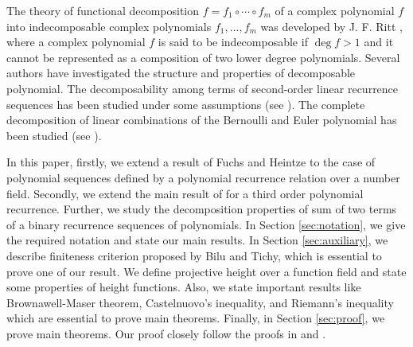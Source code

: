 \documentclass[12pt]{amsart}
\begin{document}
	
The theory of functional decomposition $f = f_1 \circ \cdots \circ f_m$ of a complex polynomial $f$ into indecomposable complex polynomials $f_1,\ldots, f_m$ was developed by J. F. Ritt \cite{ritt}, where a complex polynomial $f$ is said to be
indecomposable if $\deg f > 1$ and it cannot be represented as a composition of two lower
degree polynomials. Several authors have investigated the structure and properties of decomposable polynomial. The decomposability among terms of second-order linear recurrence sequences has been studied under some assumptions (see \cite{fuchs2019decomposable,kreso2022decompositions}). The complete decomposition of linear combinations
of the Bernoulli and Euler polynomial has been studied (see \cite{pinter, pinter2022, pinter2024}).
	
In this paper, firstly, we extend a result of Fuchs and Heintze \cite{fuchs2021diophantine} to the case of polynomial sequences defined by a polynomial recurrence relation over a number field. Secondly, we extend the main result of \cite{fuchs2019decomposable}  for a third order polynomial recurrence. Further, we study the decomposition properties of
sum of two terms of a binary recurrence sequences of polynomials. In Section \ref{sec:notation}, we give the required notation and state our main results. In Section \ref{sec:auxiliary}, we describe finiteness criterion proposed by Bilu and Tichy, which is essential to prove one of our result. We define projective height over a function field and state some properties of height functions. Also, we state important results like Brownawell-Maser theorem, Castelnuovo's inequality, and Riemann's inequality  which are essential to prove main theorems. Finally, in Section \ref{sec:proof}, we prove main theorems. Our proof closely follow the proofs in \cite{fuchs2021diophantine} and \cite{fuchs2019decomposable}.
\end{document}
